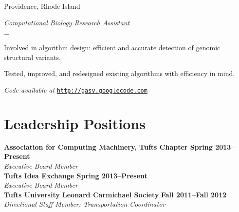\documentclass[margin,line]{res}
\newenvironment{list1}{
  \begin{list}{\ding{113}}{%
      \setlength{\itemsep}{0in}
      \setlength{\parsep}{0in} \setlength{\parskip}{0in}
      \setlength{\topsep}{0in} \setlength{\partopsep}{0in} 
      \setlength{\leftmargin}{0.17in}}}{\end{list}}
\newenvironment{list2}{
  \begin{list}{$-$}{%
      \setlength{\itemsep}{0in}
      \setlength{\parsep}{0in} \setlength{\parskip}{0in}
      \setlength{\topsep}{0in} \setlength{\partopsep}{0in} 
      \setlength{\leftmargin}{0.2in}}}{\end{list}}
\begin{document}
\begin{resume}
\vspace*{-.15in}
\begin{list1}
\item [] Providence, Rhode Island
\item [] {\em Computational Biology Research Assistant}
\item [] {\begin{list2}
\item Involved in algorithm design: efficient and accurate detection of genomic structural variants.
\item Tested, improved, and redesigned existing algorithms with efficiency in mind. 
\item {\em Code available at} \href{http://gasv.googlecode.com}{\nolinkurl{http://gasv.googlecode.com}}
\end{list2}}
\end{list1}


\section{\sc Leadership Positions}
\textbf{Association for Computing Machinery, Tufts Chapter \hfill Spring 2013--Present}\\
\emph{Executive Board Member}\\
\textbf{Tufts Idea Exchange \hfill Spring 2013--Present}\\
\emph{Executive Board Member}\\
{\bf Tufts University Leonard Carmichael Society} \hfill {\bf Fall 2011--Fall 2012}\\
{\em Directional Staff Member: Transportation Coordinator} 

%


\end{resume}
\end{document}
